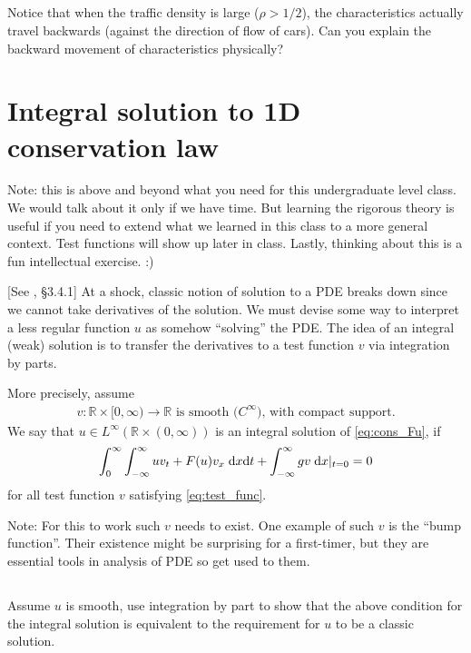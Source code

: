 \documentclass[11pt,letterpaper]{report}
\begin{document}
\subsection{}
Notice that when the traffic density is large ($\rho>1/2$), the characteristics actually travel backwards (against the direction of flow of cars). Can you explain the backward movement of characteristics physically?

\section{Integral solution to 1D conservation law}
Note: this is above and beyond what you need for this undergraduate level class. We would talk about it only if we have time. But learning the rigorous theory is useful if you need to extend what we learned in this class to a more general context. Test functions will show up later in class. Lastly, thinking about this is a fun intellectual exercise. :)

[See \cite{Evans_10}, \S3.4.1] At a shock, classic notion of solution to a PDE breaks down since we cannot take derivatives of the solution. We must devise some way to interpret a less regular function $u$ as somehow ``solving'' the PDE. The idea of an integral (weak) solution is to transfer the derivatives to a test function $v$ via integration by parts. 

More precisely, assume
\begin{align}
    v: \mathbb{R}\times[0,\infty)\to\mathbb{R} \text{ is smooth ($C^\infty$), with compact support}.\label{eq:test_func}
\end{align}
We say that $u\in L^\infty(\mathbb{R}\times(0,\infty))$ is an integral solution of \eqref{eq:cons_Fu}, if
\begin{align}
    \int^\infty_0\int^\infty_{-\infty} uv_t+F(u)v_x\;\mathrm{d} x\mathrm{d} t+\int^\infty_{-\infty} gv\;\mathrm{d} x|_{t=0} = 0
\end{align}
for all test function $v$ satisfying \eqref{eq:test_func}.

Note: For this to work such $v$ needs to exist. One example of such $v$ is the ``bump function''. Their existence might be surprising for a first-timer, but they are essential tools in analysis of PDE so get used to them.

\subsection{}
Assume $u$ is smooth, use integration by part to show that the above condition for the integral solution is equivalent to the requirement for $u$ to be a classic solution.
\end{document}
